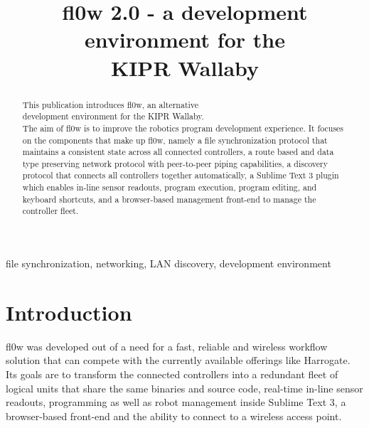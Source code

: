 \documentclass[conference]{IEEEtran}
\begin{document}
\title{fl0w 2.0 - a development environment for the\\ KIPR Wallaby}
\author{
\and
{}
\and
{}
}

\maketitle


\begin{abstract}
This publication introduces fl0w, an alternative\\ development environment for the KIPR Wallaby.\\ The aim of fl0w is to improve the robotics program development experience. It focuses on the components that make up fl0w, namely a file synchronization protocol that maintains a consistent state across all connected controllers, a route based and data type preserving network protocol with peer-to-peer piping capabilities, a discovery protocol that connects all controllers together automatically, a Sublime Text 3\cite{Sublime Text 3:Sublime HQ} plugin which enables in-line sensor readouts, program execution, program editing, and keyboard shortcuts, and a browser-based management front-end to manage the controller fleet.\\
\end{abstract}

\begin{IEEEkeywords}
file synchronization, networking, LAN discovery, development environment
\end{IEEEkeywords}



\section{Introduction}
fl0w was developed out of a need for a fast, reliable and wireless workflow solution that can compete with the currently available offerings like Harrogate\cite{Harrogate:KIPR}. Its goals are to transform the connected controllers into a redundant fleet of logical units that share the same binaries and source code, real-time in-line sensor readouts, programming as well as robot management inside Sublime Text 3\cite{Sublime Text 3:Sublime HQ}, a browser-based front-end and the ability to connect to a wireless access point.
\end{document}
